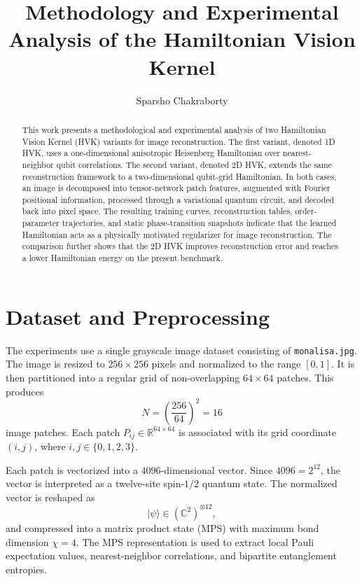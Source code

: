 \documentclass[11pt]{article}
\title{Methodology and Experimental Analysis of the Hamiltonian Vision Kernel}
\author{Sparsho Chakraborty}
\date{}
\begin{document}
\maketitle

\begin{abstract}
This work presents a methodological and experimental analysis of two Hamiltonian Vision Kernel (HVK) variants for image reconstruction. The first variant, denoted 1D HVK, uses a one-dimensional anisotropic Heisenberg Hamiltonian over nearest-neighbor qubit correlations. The second variant, denoted 2D HVK, extends the same reconstruction framework to a two-dimensional qubit-grid Hamiltonian. In both cases, an image is decomposed into tensor-network patch features, augmented with Fourier positional information, processed through a variational quantum circuit, and decoded back into pixel space. The resulting training curves, reconstruction tables, order-parameter trajectories, and static phase-transition snapshots indicate that the learned Hamiltonian acts as a physically motivated regularizer for image reconstruction. The comparison further shows that the 2D HVK improves reconstruction error and reaches a lower Hamiltonian energy on the present benchmark.
\end{abstract}

\section{Dataset and Preprocessing}

The experiments use a single grayscale image dataset consisting of \texttt{monalisa.jpg}. The image is resized to $256 \times 256$ pixels and normalized to the range $[0,1]$. It is then partitioned into a regular grid of non-overlapping $64 \times 64$ patches. This produces
\begin{equation}
N = \left(\frac{256}{64}\right)^2 = 16
\end{equation}
image patches. Each patch $P_{ij} \in \mathbb{R}^{64 \times 64}$ is associated with its grid coordinate $(i,j)$, where $i,j \in \{0,1,2,3\}$.

Each patch is vectorized into a $4096$-dimensional vector. Since $4096 = 2^{12}$, the vector is interpreted as a twelve-site spin-$1/2$ quantum state. The normalized vector is reshaped as
\begin{equation}
|\psi\rangle \in \left(\mathbb{C}^{2}\right)^{\otimes 12},
\end{equation}
and compressed into a matrix product state (MPS) with maximum bond dimension $\chi=4$. The MPS representation is used to extract local Pauli expectation values, nearest-neighbor correlations, and bipartite entanglement entropies.
\end{document}
